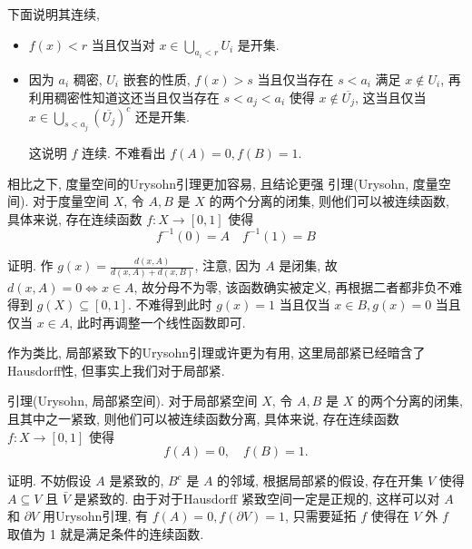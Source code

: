 \documentclass[options]{article}
\renewcommand{\emph}[1]{\CJKunderline{#1}}
\begin{document}
下面说明其连续,
\begin{itemize}
	\item $f(x)<r$ 当且仅当对 $x \in \bigcup_{a_i<r} U_i$ 是开集.
	\item 因为 $a_i$ 稠密, $U_i$ 嵌套的性质, $f(x)>s$ 当且仅当存在 $s<a_i$ 满足 $x \notin U_i$, 再利用稠密性知道这还当且仅当存在 $s<a_j<a_i$ 使得 $x \notin \overline{U_j}$, 这当且仅当 $x \in \bigcup_{s<a_j}\left(\overline{U_j}\right)^c$ 还是开集.

			这说明 $f$ 连续. 不难看出 $f(A)=0, f(B)=1$.
\end{itemize}
\begin{remark}

	相比之下, 度量空间的Urysohn引理更加容易, 且结论更强
	\hrulefill
	引理(Urysohn, 度量空间). 对于度量空间 $X$, 令 $A, B$ 是 $X$ 的两个分离的闭集, 则他们可以被连续函数\emph{完全分离}, 具体来说, 存在连续函数 $f: X \rightarrow[0,1]$ 使得
	\[
			f^{-1}(0)=A \quad f^{-1}(1)=B
	\]
\end{remark}
证明. 作 $g(x)=\frac{d(x, A)}{d(x, A)+d(x, B)}$, 注意, 因为 $A$ 是闭集, 故 $d(x, A)=0 \Longleftrightarrow x \in A$, 故分母不为零, 该函数确实被定义, 再根据二者都非负不难得到 $g(X) \subseteq[0,1]$. 不难得到此时 $g(x)=1$ 当且仅当 $x \in B, g(x)=0$ 当且仅当 $x \in A$, 此时再调整一个线性函数即可.

\begin{remark}
	作为类比, 局部紧致下的Urysohn引理或许更为有用, 这里局部紧已经暗含了Hausdorff性, 但事实上我们对于局部紧.

	\hrulefill

	引理(Urysohn, 局部紧空间). 对于局部紧空间 $X$, 令 $A, B$ 是 $X$ 的两个分离的闭集, 且其中之一紧致, 则他们可以被连续函数分离, 具体来说, 存在连续函数 $f: X \rightarrow[0,1]$ 使得
	\[
			f(A)=0, \quad f(B)=1.
	\]
\end{remark}

证明. 不妨假设 $A$ 是紧致的, $B^c$ 是 $A$ 的邻域, 根据局部紧的假设, 存在开集 $V$ 使得 $A \subseteq V$ 且 $\bar{V}$ 是紧致的. 由于对于Hausdorff 紧致空间一定是正规的, 这样可以对 $A$ 和 $\partial V$ 用Urysohn引理, 有 $f(A)=0, f(\partial V)=1$, 只需要延拓 $f$ 使得在 $V$ 外 $f$ 取值为 1 就是满足条件的连续函数.
\end{document}
